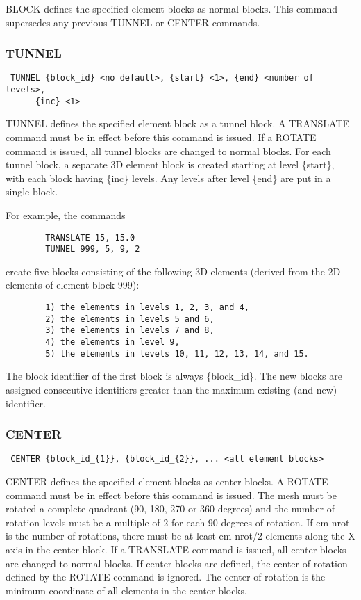 BLOCK defines the specified element blocks as normal blocks.  This
command supersedes any previous TUNNEL or CENTER commands.
\subsubsection{TUNNEL}
\begin{verbatim}
 TUNNEL {block_id} <no default>, {start} <1>, {end} <number of levels>,
      {inc} <1>
\end{verbatim}

TUNNEL defines the specified element block as a tunnel block.  A
TRANSLATE command must be in effect before this command is issued.  If a
ROTATE command is issued, all tunnel blocks are changed to normal
blocks.
For each tunnel block, a separate 3D element block is created starting
at level \{start\}, with each block having \{inc\} levels.  Any levels after
level \{end\} are put in a single block.

For example, the commands

\begin{verbatim}
        TRANSLATE 15, 15.0
        TUNNEL 999, 5, 9, 2
\end{verbatim}

create five blocks consisting of the following 3D elements (derived from
the 2D elements of element block 999):

\begin{verbatim}
        1) the elements in levels 1, 2, 3, and 4,
        2) the elements in levels 5 and 6,
        3) the elements in levels 7 and 8,
        4) the elements in level 9,
        5) the elements in levels 10, 11, 12, 13, 14, and 15.
\end{verbatim}


The block identifier of the first block is always \{block\_id\}.  The new
blocks are assigned consecutive identifiers greater than the maximum
existing (and new) identifier.
\subsubsection{CENTER}
\begin{verbatim}
 CENTER {block_id_{1}}, {block_id_{2}}, ... <all element blocks>
\end{verbatim}

CENTER defines the specified element blocks as center blocks.  A ROTATE
command must be in effect before this command is issued.  The mesh must
be rotated a complete quadrant (90, 180, 270 or 360 degrees) and the
number of rotation levels must be a multiple of 2 for each 90 degrees of
rotation.  If em nrot is the number of rotations, there must be at least
em nrot/2 elements along the X axis in the center block.  If a TRANSLATE
command is issued, all center blocks are changed to normal blocks.  If
center blocks are defined, the center of rotation defined by the ROTATE
command is ignored.  The center of rotation is the minimum coordinate of
all elements in the center blocks.
